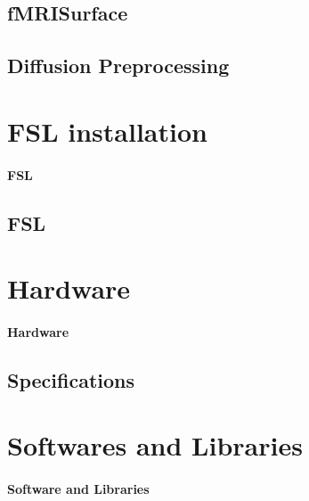 \subsection{fMRISurface}
\subsection{Diffusion Preprocessing}

\section{FSL installation}
\paragraph{FSL}
\subsection{FSL}

\section{Hardware}
\paragraph{Hardware}
\subsection{Specifications}

\section{Softwares and Libraries}
\paragraph{Software and Libraries}
